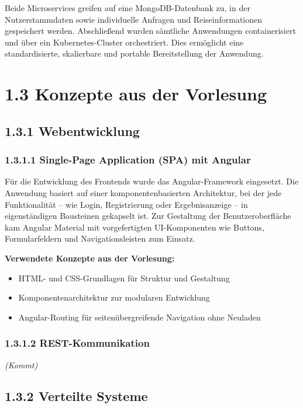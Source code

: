 Beide Microservices greifen auf eine MongoDB-Datenbank zu, in der Nutzerstammdaten sowie individuelle Anfragen und Reiseinformationen gespeichert werden.  
Abschließend wurden sämtliche Anwendungen containerisiert und über ein Kubernetes-Cluster orchestriert. Dies ermöglicht eine standardisierte, skalierbare und portable Bereitstellung der Anwendung.

\section*{1.3 Konzepte aus der Vorlesung}

\subsection*{1.3.1 Webentwicklung}

\subsubsection*{1.3.1.1 Single-Page Application (SPA) mit Angular}

Für die Entwicklung des Frontends wurde das Angular-Framework eingesetzt. Die Anwendung basiert auf einer komponentenbasierten Architektur, bei der jede Funktionalität – wie Login, Registrierung oder Ergebnisanzeige – in eigenständigen Bausteinen gekapselt ist. Zur Gestaltung der Benutzeroberfläche kam Angular Material mit vorgefertigten UI-Komponenten wie Buttons, Formularfeldern und Navigationsleisten zum Einsatz.

\textbf{Verwendete Konzepte aus der Vorlesung:}
\begin{itemize}
  \item HTML- und CSS-Grundlagen für Struktur und Gestaltung
  \item Komponentenarchitektur zur modularen Entwicklung
  \item Angular-Routing für seitenübergreifende Navigation ohne Neuladen
\end{itemize}

\subsubsection*{1.3.1.2 REST-Kommunikation}
\textit{(Kommt)}

\subsection*{1.3.2 Verteilte Systeme}

